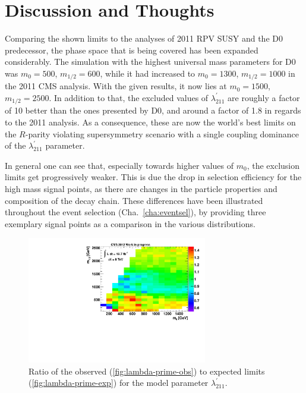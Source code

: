 \section{Discussion and Thoughts}
\label{sec:discussion}

Comparing the shown limits to the analyses of 2011 RPV SUSY and the D0 predecessor, the phase space that is being covered has been expanded considerably. The simulation with the highest universal mass parameters for D0 was $m_0 = 500$, $m_{1/2} = 600$, while it had increased to $m_0 = 1300$, $m_{1/2} = 1000$ in the 2011 CMS analysis. With the given results, it now lies at $m_0 = 1500$, $m_{1/2} = 2500$. In addition to that, the excluded values of $\lambda^{\prime}_{211}$ are roughly a factor of 10 better than the ones presented by D0, and around a factor of 1.8 in regards to the 2011 analysis. As a consequence, these are now the world's best limits on the $R$-parity violating supersymmetry scenario with a single coupling dominance of the $\lambda^{\prime}_{211}$ parameter.

In general one can see that, especially towards higher values of $m_0$, the exclusion limits get progressively weaker. This is due the drop in selection efficiency for the high mass signal points, as there are changes in the particle properties and composition of the decay chain. These differences have been illustrated throughout the event selection (Cha.~\ref{cha:eventsel}), by providing three exemplary signal points as a comparison in the various distributions.


\begin{figure}[!htb]
  \centering
  \includegraphics[width=0.7\textwidth]{plots/lambda_ratio.pdf}
  \caption{Ratio of the observed (\ref{fig:lambda-prime-obs}) to expected limits (\ref{fig:lambda-prime-exp}) for the model parameter $\lambda^{\prime}_{211}$.}
  \label{fig:lambda_ratio}
\end{figure}

